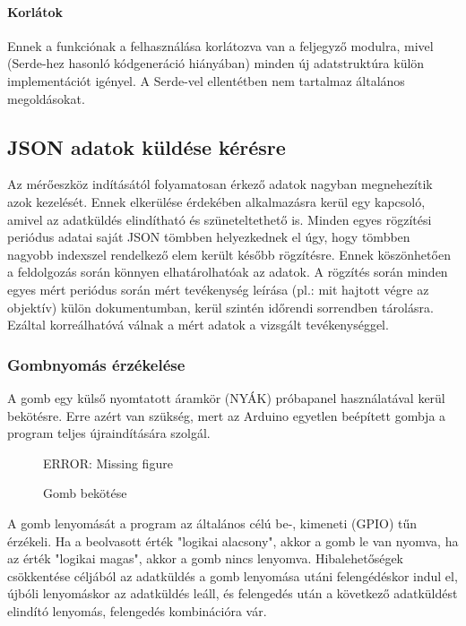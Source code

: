 \paragraph{Korlátok}

Ennek a funkciónak a felhasználása korlátozva van a feljegyző modulra, mivel (Serde-hez hasonló kódgeneráció hiányában) minden új adatstruktúra külön implementációt igényel.
A Serde-vel ellentétben nem tartalmaz általános megoldásokat.

\subsection{JSON adatok küldése kérésre}
Az mérőeszköz indításától folyamatosan érkező adatok nagyban megnehezítik azok kezelését.
Ennek elkerülése érdekében alkalmazásra kerül egy kapcsoló, amivel az adatküldés elindítható és szüneteltethető is.
Minden egyes rögzítési periódus adatai saját JSON tömbben helyezkednek el úgy, hogy tömbben nagyobb indexszel rendelkező elem került később rögzítésre.
Ennek köszönhetően a feldolgozás során könnyen elhatárolhatóak az adatok.
A rögzítés során minden egyes mért periódus során mért tevékenység leírása (pl.: mit hajtott végre az objektív) külön dokumentumban, kerül szintén időrendi sorrendben tárolásra.
Ezáltal korreálhatóvá válnak a mért adatok a vizsgált tevékenységgel.

\subsubsection{Gombnyomás érzékelése}
A gomb egy külső nyomtatott áramkör (NYÁK) próbapanel használatával kerül bekötésre.
Erre azért van szükség, mert az Arduino egyetlen beépített gombja a program teljes újraindítására szolgál.
\begin{figure}[H]
    \label{fig: gombkotes}
    ERROR: Missing figure
    \caption{Gomb bekötése}
\end{figure}
A gomb lenyomását a program az általános célú be-, kimeneti (GPIO) tűn érzékeli.
Ha a beolvasott érték "logikai alacsony", akkor a gomb le van nyomva, ha az érték "logikai magas", akkor a gomb nincs lenyomva.
Hibalehetőségek csökkentése céljából az adatküldés a gomb lenyomása utáni felengédéskor indul el,
újbóli lenyomáskor az adatküldés leáll, és felengedés után a következő adatküldést elindító lenyomás, felengedés kombinációra vár.
